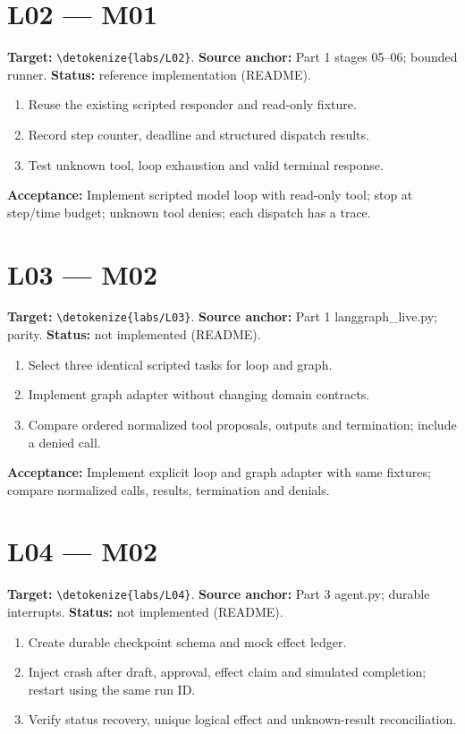 \documentclass[11pt,letterpaper]{article}
\newcommand{\src}[1]{\expandafter\nolinkurl\expandafter{\detokenize{#1}}}
\begin{document}
\section{L02 --- M01}

\textbf{Target:} \src{labs/L02}. \textbf{Source anchor:} Part 1 stages 05--06; bounded runner. \textbf{Status:} reference implementation (README).

\begin{enumerate}
\item Reuse the existing scripted responder and read-only fixture.
\item Record step counter, deadline and structured dispatch results.
\item Test unknown tool, loop exhaustion and valid terminal response.
\end{enumerate}

\textbf{Acceptance:} Implement scripted model loop with read-only tool; stop at step/time budget; unknown tool denies; each dispatch has a trace.

\section{L03 --- M02}

\textbf{Target:} \src{labs/L03}. \textbf{Source anchor:} Part 1 langgraph\_live.py; parity. \textbf{Status:} not implemented (README).

\begin{enumerate}
\item Select three identical scripted tasks for loop and graph.
\item Implement graph adapter without changing domain contracts.
\item Compare ordered normalized tool proposals, outputs and termination; include a denied call.
\end{enumerate}

\textbf{Acceptance:} Implement explicit loop and graph adapter with same fixtures; compare normalized calls, results, termination and denials.

\section{L04 --- M02}

\textbf{Target:} \src{labs/L04}. \textbf{Source anchor:} Part 3 agent.py; durable interrupts. \textbf{Status:} not implemented (README).

\begin{enumerate}
\item Create durable checkpoint schema and mock effect ledger.
\item Inject crash after draft, approval, effect claim and simulated completion; restart using the same run ID.
\item Verify status recovery, unique logical effect and unknown-result reconciliation.
\end{enumerate}
\end{document}
